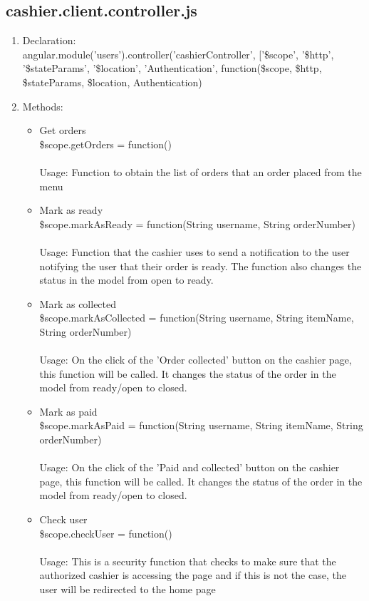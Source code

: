 \documentclass[a4paper,12pt]{article}
\begin{document}
\subsection{cashier.client.controller.js}
\begin{enumerate}
\item Declaration: \\ angular.module('users').controller('cashierController', ['\$scope', '\$http', '\$stateParams', '\$location', 'Authentication',
	function(\$scope, \$http, \$stateParams, \$location, Authentication) 
\item Methods:
	\begin{itemize}
		\item Get orders \\ \$scope.getOrders = function()
		\\ \\ Usage: Function to obtain the list of orders that an order placed from the menu 
		\item Mark as ready \\ \$scope.markAsReady = function(String username, String orderNumber) 
		\\ \\ Usage: Function that the cashier uses to send a notification to the user notifying the user that their order is ready. The function also changes the status in the model from open to ready.
	\item Mark as collected \\ \$scope.markAsCollected = function(String username, String itemName, String orderNumber) 
	\\ \\ Usage: On the click of the 'Order collected' button on the cashier page, this function will be called. It changes the status of the order in the model from ready/open to closed.
	\item Mark as paid \\ \$scope.markAsPaid = function(String username, String itemName, String orderNumber)  
	\\ \\ Usage: On the click of the 'Paid and collected' button on the cashier page, this function will be called. It changes the status of the order in the model from ready/open to closed.
	\item Check user \\ \$scope.checkUser = function() 
	\\ \\ Usage: This is a security function that checks to make sure that the authorized cashier is accessing the page and if this is not the case, the user will be redirected to the home page
	\end{itemize}	
\end{enumerate}
\end{document}

